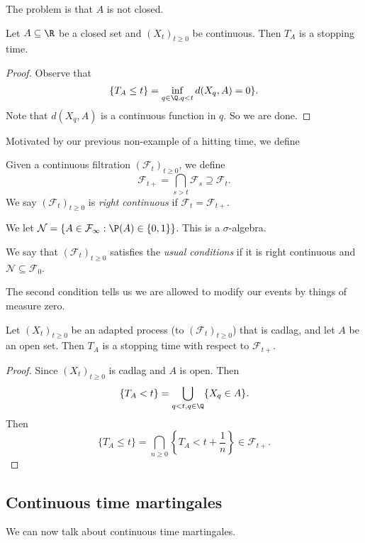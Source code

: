 \documentclass[a4paper]{article}
\begin{document}
The problem is that $A$ is not closed.

\begin{prop}
  Let $A \subseteq \R$ be a closed set and $(X_t)_{t \geq 0}$ be continuous. Then $T_A$ is a stopping time.
\end{prop}

\begin{proof}
  Observe that
  \[
    \{T_A \leq t\} = \inf_{q \in \Q, q < t} d(X_q, A) = 0\}.
  \]
  Note that $d(X_q, A)$ is a continuous function in $q$. So we are done.
\end{proof}

Motivated by our previous non-example of a hitting time, we define
\begin{defi}
  Given a continuous filtration $(\mathcal{F}_t)_{t \geq 0}$, we define
  \[
    \mathcal{F}_{t+} = \bigcap_{s > t} \mathcal{F}_s \supseteq \mathcal{F}_t.
  \]
  We say $(\mathcal{F}_t)_{t \geq 0}$ is \emph{right continuous} if $\mathcal{F}_t = \mathcal{F}_{t+}$.
\end{defi}

We let $\mathcal{N} = \{A \in \mathcal{F}_\infty : \P(A) \in \{0, 1\}\}$. This is a $\sigma$-algebra.
\begin{defi}
  We say that $(\mathcal{F}_t)_{t \geq 0}$ satisfies the \emph{usual conditions} if it is right continuous and $\mathcal{N} \subseteq \mathcal{F}_0$.
\end{defi}
The second condition tells us we are allowed to modify our events by things of measure zero.

\begin{prop}
  Let $(X_t)_{t \geq 0}$ be an adapted process (to $(\mathcal{F}_{t})_{t \geq 0}$) that is cadlag, and let $A$ be an open set. Then $T_A$ is a stopping time with respect to $\mathcal{F}_{t+}$.
\end{prop}

\begin{proof}
  Since $(X_t)_{t \geq 0}$ is cadlag and $A$ is open. Then
  \[
    \{T_A < t\} = \bigcup_{q < t, q \in \Q} \{X_q \in A\}.
  \]
  Then
  \[
    \{T_A \leq t\} = \bigcap_{n \geq 0} \left\{T_A < t + \frac{1}{n}\right\} \in \mathcal{F}_{t+}.
  \]
\end{proof}

\subsection{Continuous time martingales}
We can now talk about continuous time martingales.
\end{document}
